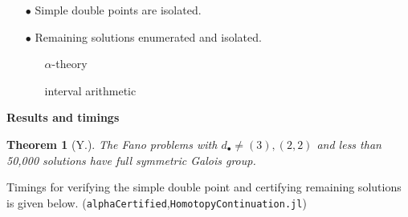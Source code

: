 \documentclass[final]{beamer}
\theoremstyle{thrm}
\newtheorem{thm}{Theorem}
\newcommand{\headft}[1]{
\begin{center}
{\color{aggiemaroon}\textbf{\quad\LARGE{#1}\quad}}
\end{center}
}
\begin{document}
\begin{frame}
\begin{minipage}[t]{.3\textwidth}
\begin{enumerate}
\item[$\bullet$] Simple double points are isolated.

\item[$\bullet$] Remaining solutions enumerated and isolated.

\vspace{.5cm}

\begin{enumerate}
\item[\scalebox{.8}{\color{aggiemaroon}$\blacksquare$}] \Large $\alpha$-theory \normalsize

\item[\scalebox{.7}{\color{aggiemaroon}$\blacksquare$}] \Large interval arithmetic
\end{enumerate}
\end{enumerate}

\vspace{.1cm}
\headft{Results and timings}
\begin{thm}[\raisebox{-.1cm}{\,}Y.\raisebox{.9cm}{\,}]
\vspace{.2cm}
\Large The Fano problems with $d_\bullet\ne (3),(2,2)$ and less than 50,000 solutions have full symmetric Galois group.
\vspace{.1cm}
\end{thm}

\vspace{-.05cm}

Timings for verifying the simple double point and certifying remaining solutions is given below. (\texttt{alphaCertified},\texttt{HomotopyContinuation.jl})

\vspace{-.8cm}


\end{minipage}
\end{frame}
\end{document}
